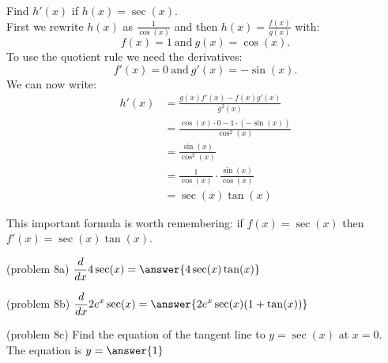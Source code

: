 \documentclass[handout]{ximera}
\begin{document}
\begin{example}[example 8]
Find $h'(x)$ if $h(x) = \sec(x).$\\
First we rewrite $h(x)$ as $\displaystyle{\frac{1}{\cos(x)}}$ 
and then $\displaystyle{h(x) = \frac{f(x)}{g(x)}}$ with:
\[f(x) = 1 \  \mbox{and} \  g(x)= \cos(x).\]
To use the quotient rule we need the derivatives:
\[f'(x) = 0 \  \mbox{and} \   g'(x) = -\sin(x).\]
We can now write: 
\begin{align*}
h'(x) &= \frac{g(x)f'(x) - f(x)g'(x)}{g^2(x)}\\
&= \frac{\cos(x)\cdot 0 - 1\cdot (-\sin(x))}{\cos^2(x)}\\
&= \frac{ \sin(x)}{\cos^2(x)} \\
&= \frac{ 1}{\cos(x)} \cdot \frac{\sin(x)}{\cos(x)}\\
&=  \sec(x) \tan(x)
\end{align*}

This important formula is worth remembering: if $f(x) = \sec(x)$ then $f'(x) =\sec(x) \tan(x)$.
\end{example}



\begin{center}
\begin{foldable}
\end{foldable}
\end{center}


\begin{problem}(problem 8a)
  $\displaystyle{\frac{d}{dx} 4\sec(x)= \answer{4\sec(x)\tan(x)}}$\\
\end{problem}

\begin{problem}(problem 8b)
  $\displaystyle{\frac{d}{dx} 2e^x \sec(x)= \answer{2e^x\sec(x)(1+\tan(x))}}$\\
\end{problem}

\begin{problem}(problem 8c)
  Find the equation of the tangent line to $y = \sec(x)$ at $x = 0$.\\
  The equation is $y = \answer{1}$
\end{problem}
\end{document}
